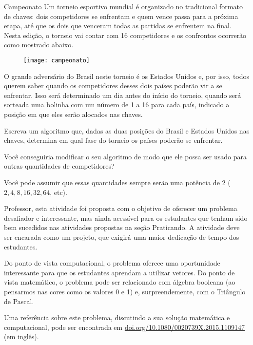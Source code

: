 \begin{task}{Campeonato}
Um torneio esportivo mundial é organizado no tradicional formato de chaves: dois competidores se enfrentam e quem vence passa para a próxima etapa, até que os dois que venceram todas as partidas se enfrentem na final. Nesta edição, o torneio vai contar com 16 competidores e os confrontos ocorrerão como mostrado abaixo.

\begin{figure}[H]
\centering

\texttt{[image: campeonato]}
\end{figure}

O grande adversário do Brasil neste torneio é os Estados Unidos e, por isso, todos querem saber quando os competidores desses dois países poderão vir a se enfrentar. Isso será determinado um dia antes do início do torneio, quando será sorteada uma bolinha com um número de 1 a 16 para cada país, indicado a posição em que eles serão alocados nas chaves.

Escreva um algoritmo que, dadas as duas posições do Brasil e Estados Unidos nas chaves, determina em qual fase do torneio os países poderão se enfrentar.
\end{task}

\begin{reflection}
Você conseguiria modificar o seu algoritmo de modo que ele possa ser usado para outras quantidades de competidores?

Você pode assumir que essas quantidades sempre serão uma potência de $2$ ($2, 4, 8, 16, 32, 64$, etc).
\end{reflection}



\clearmargin
\begin{texto}
{
Professor, esta atividade foi proposta com o objetivo de oferecer um problema desafiador e interessante, mas ainda acessível para os estudantes que tenham sido bem sucedidos nas atividades propostas na seção Praticando. A atividade deve ser encarada como um projeto, que exigirá uma maior dedicação de tempo dos estudantes.

Do ponto de vista computacional, o problema oferece uma oportunidade interessante para que os estudantes aprendam a utilizar vetores. Do ponto de vista matemático, o problema pode ser relacionado com álgebra booleana (ao pensarmos nas cores como os valores 0 e 1) e, surpreendemente, com o Triângulo de Pascal.

Uma referência sobre este problema, discutindo a sua solução matemática e computacional, pode ser encontrada em \url{doi.org/10.1080/0020739X.2015.1109147} (em inglês).
}
\end{texto}

